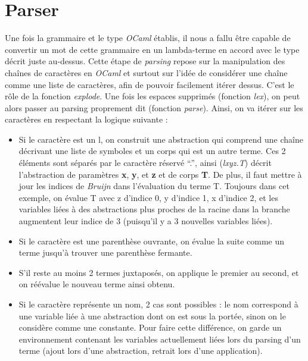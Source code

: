 \documentclass[11pt,a4paper]{report}
\begin{document}
\section{Parser}
\bigskip
Une fois la grammaire et le type \textit{OCaml} établis, il nous a fallu être capable de convertir un mot de cette grammaire en un lambda-terme en accord avec le type décrit juste au-dessus. Cette étape de \textit{parsing} repose sur la manipulation des chaînes de caractères en \textit{OCaml} et surtout sur l'idée de considérer une chaîne comme une liste de caractères, afin de pouvoir facilement itérer dessus. C'est le rôle de la fonction \textit{explode}. Une fois les espaces supprimés (fonction \textit{lex}), on peut alors passer au parsing proprement dit (fonction \textit{parse}). Ainsi, on va itérer sur les caractères en respectant la logique suivante :
\medskip
\begin{itemize}
\item Si le caractère est un l, on construit une abstraction qui comprend une chaîne décrivant une liste de symboles et un corps qui est un autre terme. Ces 2 éléments sont séparés par le caractère réservé ``.'', ainsi (\textit{lxyz.T}) décrit l'abstraction de paramètres \textbf{x}, \textbf{y}, et \textbf{z} et de corps \textbf{T}. De plus, il faut mettre à jour les indices de \textit{Bruijn} dans l'évaluation du terme T. Toujours dans cet exemple, on évalue T avec z d'indice 0, y d'indice 1, x d'indice 2, et les variables liées à des abstractions plus proches de la racine dans la branche augmentent leur indice de 3 (puisqu'il y a 3 nouvelles variables liées).

\item Si le caractère est une parenthèse ouvrante, on évalue la suite comme un terme jusqu'à trouver une parenthèse fermante.

\item S'il reste au moins 2 termes juxtaposés, on applique le premier au second, et on réévalue le nouveau terme ainsi obtenu.

\item Si le caractère représente un nom, 2 cas sont possibles : le nom correspond à une variable liée à une abstraction dont on est sous la portée, sinon on le considère comme une constante. Pour faire cette différence, on garde un environnement contenant les variables actuellement liées lors du parsing d'un terme (ajout lors d'une abstraction, retrait lors d'une application).

\end{itemize}
\end{document}
